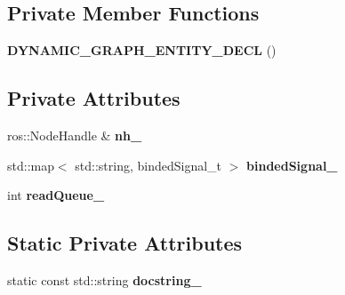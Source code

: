 \subsection*{Private Member Functions}
\begin{DoxyCompactItemize}
\item 
\mbox{\label{classdynamic__graph_1_1RosQueuedSubscribe_a3d52d1de001cc0b71410b3da7429a751}} 
{\bfseries D\+Y\+N\+A\+M\+I\+C\+\_\+\+G\+R\+A\+P\+H\+\_\+\+E\+N\+T\+I\+T\+Y\+\_\+\+D\+E\+CL} ()
\end{DoxyCompactItemize}
\subsection*{Private Attributes}
\begin{DoxyCompactItemize}
\item 
\mbox{\label{classdynamic__graph_1_1RosQueuedSubscribe_a4795502ea5dc4f01158b850cc3f63f00}} 
ros\+::\+Node\+Handle \& {\bfseries nh\+\_\+}
\item 
\mbox{\label{classdynamic__graph_1_1RosQueuedSubscribe_acb4476833404b04da8012ed5a4c84150}} 
std\+::map$<$ std\+::string, binded\+Signal\+\_\+t $>$ {\bfseries binded\+Signal\+\_\+}
\item 
\mbox{\label{classdynamic__graph_1_1RosQueuedSubscribe_a264c8494a5545e63679ad0bfdb4dd614}} 
int {\bfseries read\+Queue\+\_\+}
\end{DoxyCompactItemize}
\subsection*{Static Private Attributes}
\begin{DoxyCompactItemize}
\item 
\mbox{\label{classdynamic__graph_1_1RosQueuedSubscribe_a07f6aa0c68e2a97c04fce2b001c41f75}} 
static const std\+::string {\bfseries docstring\+\_\+}
\end{DoxyCompactItemize}
